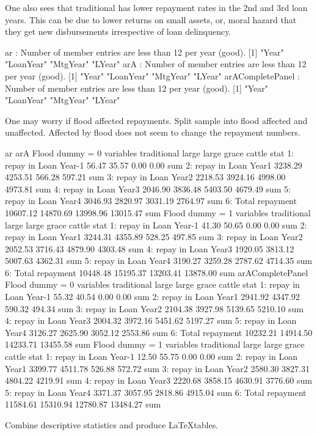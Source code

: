 One also sees that \textsf{traditional} has lower repayment rates in the 2nd and 3rd loan years. This can be due to lower returns on small assets, or, moral hazard that they get new disbursements irrespective of loan delinquency. 
\begin{Schunk}
\begin{Soutput}
ar : Number of member entries are less than 12 per year (good).
[1] "Year"     "LoanYear" "MtgYear"  "LYear"   
arA : Number of member entries are less than 12 per year (good).
[1] "Year"     "LoanYear" "MtgYear"  "LYear"   
arACompletePanel : Number of member entries are less than 12 per year (good).
[1] "Year"     "LoanYear" "MtgYear"  "LYear"   
\end{Soutput}
\end{Schunk}
One may worry if flood affected repayments. Split sample into flood affected and unaffected. Affected by flood does not seem to change the repayment numbers.
\begin{Schunk}
\begin{Soutput}
ar 
arA 
Flood dummy = 0
              variables traditional    large large grace   cattle stat
1: repay in Loan Year-1       56.47    35.57        0.00     0.00  sum
2:  repay in Loan Year1     3238.29  4253.51      566.28   597.21  sum
3:  repay in Loan Year2     2218.53  3924.16     4998.00  4973.81  sum
4:  repay in Loan Year3     2046.90  3836.48     5403.50  4679.49  sum
5:  repay in Loan Year4     3046.93  2820.97     3031.19  2764.97  sum
6:      Total repayment    10607.12 14870.69    13998.96 13015.47  sum
Flood dummy = 1
              variables traditional    large large grace   cattle stat
1: repay in Loan Year-1       41.30    50.65        0.00     0.00  sum
2:  repay in Loan Year1     3244.31  4355.89      528.25   497.85  sum
3:  repay in Loan Year2     2052.53  3716.43     4879.90  4303.48  sum
4:  repay in Loan Year3     1920.05  3813.12     5007.63  4362.31  sum
5:  repay in Loan Year4     3190.27  3259.28     2787.62  4714.35  sum
6:      Total repayment    10448.48 15195.37    13203.41 13878.00  sum
arACompletePanel 
Flood dummy = 0
              variables traditional    large large grace   cattle stat
1: repay in Loan Year-1       55.32    40.54        0.00     0.00  sum
2:  repay in Loan Year1     2941.92  4347.92      590.32   494.34  sum
3:  repay in Loan Year2     2104.38  3927.98     5139.65  5210.10  sum
4:  repay in Loan Year3     2004.32  3972.16     5451.62  5197.27  sum
5:  repay in Loan Year4     3126.27  2625.90     3052.12  2553.86  sum
6:      Total repayment    10232.21 14914.50    14233.71 13455.58  sum
Flood dummy = 1
              variables traditional    large large grace   cattle stat
1: repay in Loan Year-1       12.50    55.75        0.00     0.00  sum
2:  repay in Loan Year1     3399.77  4511.78      526.88   572.72  sum
3:  repay in Loan Year2     2580.30  3827.31     4804.22  4219.91  sum
4:  repay in Loan Year3     2220.68  3858.15     4630.91  3776.60  sum
5:  repay in Loan Year4     3371.37  3057.95     2818.86  4915.04  sum
6:      Total repayment    11584.61 15310.94    12780.87 13484.27  sum
\end{Soutput}
\end{Schunk}
Combine descriptive statistics and produce \LaTeX  tables.


